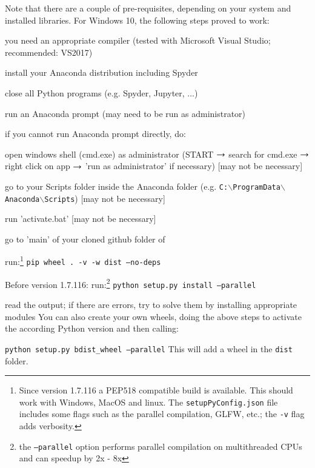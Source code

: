 Note that there are a couple of pre-requisites, depending on your system and installed libraries. For Windows 10, the following steps proved to work:
\bi
  \item you need an appropriate compiler (tested with Microsoft Visual Studio; recommended: VS2017)
  \item install your Anaconda distribution including Spyder
  \item close all Python programs (e.g. Spyder, Jupyter, ...) 
  \item run an Anaconda prompt (may need to be run as administrator)
  \item if you cannot run Anaconda prompt directly, do:
  \bi
    \item open windows shell (cmd.exe) as administrator (START $\rightarrow$ search for cmd.exe $\rightarrow$ right click on app $\rightarrow$ 'run as administrator' if necessary) [may not be necessary]
    \item go to your Scripts folder inside the Anaconda folder (e.g. \texttt{C:$\backslash$ProgramData$\backslash$Anaconda$\backslash$Scripts}) [may not be necessary]
    \item run 'activate.bat' [may not be necessary]
  \ei
  \item go to 'main' of your cloned github folder of \codeName 
  \item run:\footnote{Since version 1.7.116 a PEP518 compatible build is available. This should work with Windows, MacOS and linux. The \texttt{setupPyConfig.json} file includes some flags such as the parallel compilation, GLFW, etc.; the \texttt{-v} flag adds verbosity.} \texttt{pip wheel . -v -w dist --no-deps}
  \item Before version 1.7.116: run:\footnote{the \texttt{--parallel} option performs parallel compilation on multithreaded CPUs and can speedup by 2x - 8x} \texttt{python setup.py install --parallel}
  \item read the output; if there are errors, try to solve them by installing appropriate modules
\ei
You can also create your own wheels, doing the above steps to activate the according Python version and then calling:
\bi
  \item[] \texttt{python setup.py bdist\_wheel --parallel}
\ei
This will add a wheel in the \texttt{dist} folder.

